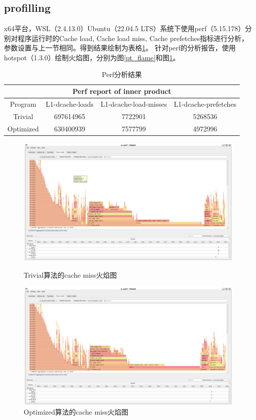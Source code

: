 \documentclass[12pt, a4paper, oneside]{ctexart}
\begin{document}
\subsection{profilling}
x64平台，WSL（2.4.13.0）Ubuntu（22.04.5 LTS）系统下使用perf（5.15.178）分别对程序运行时的Cache load,
Cache load miss, Cache prefetches指标进行分析，参数设置与上一节相同。得到结果绘制为表格\ref{product_perf}。
针对perf的分析报告，使用hotspot（1.3.0）绘制火焰图，分别为图\ref{pt_flame}和图\ref{po_flame}。
\begin{table}
\centering
\begin{tabular}{c c c c}
    \hline
    \multicolumn{4}{c}{Perf report of inner product} \\
    \hline
    \hline
    Program & L1-dcache-loads & L1-dcache-load-misses & L1-dcache-prefetches \\
    Trivial & 697614965 & 7722901 & 5268536 \\
    Optimized & 630400939 & 7577799 & 4972996 \\
    \hline
\end{tabular}
\caption{Perf分析结果}
\label{product_perf}
\end{table}
\begin{figure}[htbp]
    \centering
    \begin{minipage}{0.9\linewidth}
        \centering
        \includegraphics[scale = 0.4]{./picture/pt_flame.eps}
        \caption{Trivial算法的cache miss火焰图}
        \label{pt_flame}
    \end{minipage}
    \centering
    \begin{minipage}{0.9\linewidth}
        \centering
        \includegraphics[scale = 0.4]{./picture/po_flame.eps}
        \caption{Optimized算法的cache miss火焰图}
        \label{po_flame}
    \end{minipage}
\end{figure}
\end{document}
